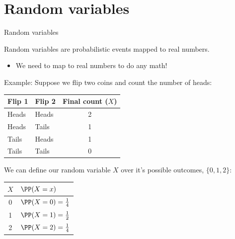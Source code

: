 \section{Random variables}
\miniframesoff
\begin{frame}
    \tableofcontents[currentsection]
\end{frame}
\miniframeson



\begin{frame}{Random variables}

Random variables are probabilistic events mapped to real numbers. 
\begin{itemize}
    \item We need to map to real numbers to do any math!
\end{itemize}

Example: Suppose we flip two coins and count the number of heads:
\begin{table}
\begin{tabular}{llc}
Flip 1 &Flip 2  &Final count ($X$) \\
\hline
Heads   &Heads  &2 \\
Heads   &Tails  &1 \\
Tails   &Heads  &1 \\
Tails   &Tails  &0 
\end{tabular}
\end{table}

We can define our random variable $X$ over it's possible outcomes, $\{0, 1, 2\}$:
\begin{table}
\begin{tabular}{cl}
$X$ &$\PP (X = x)$ \\
\hline
0 & $\PP (X = 0) = \frac{1}{4}$\\
1 &$\PP (X = 1) = \frac{1}{2}$\\
2 &$\PP (X = 2) = \frac{1}{4}$\\
\end{tabular}
\end{table}




\end{frame}


